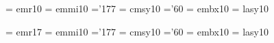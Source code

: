  \font\frtnrm  = emr10     %
 \font\frtnmi  = emmi10    %
    \skewchar\frtnmi ='177          %
 \font\frtnsy  = cmsy10    %
    \skewchar\frtnsy ='60           %
 \font\frtnbf  = embx10    %
 \font\frtnly  = lasy10   %
 
 \font\svtnrm  = emr17                %
 \font\svtnmi  = emmi10    %
    \skewchar\svtnmi ='177          %
 \font\svtnsy  = cmsy10    %
    \skewchar\svtnsy ='60           %
 \font\svtnbf  = embx10    %
 \font\svtnly  = lasy10   %
 
